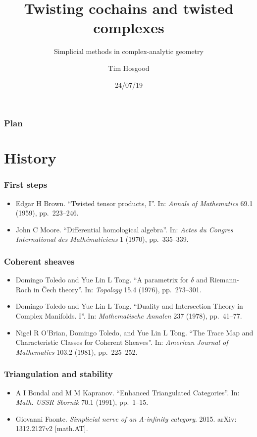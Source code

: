 \documentclass{beamer}
\title{Twisting cochains and twisted complexes}
\subtitle{Simplicial methods in complex-analytic geometry}
\author{Tim Hosgood}
\institute{Université d'Aix-Marseille\\\url{https://thosgood.github.io}}
\date{24/07/19}
\begin{document}
\begin{frame}
    \titlepage
\end{frame}

\begin{frame}\frametitle{Plan}
    \vspace{1em}
    \tableofcontents
\end{frame}


\section{History}

    \begin{frame}\frametitle{First steps}
        \begin{itemize}
            \item Edgar H Brown. ``Twisted tensor products, I''. In: \emph{Annals of Mathematics} 69.1 (1959), pp.~223--246.
            \item John C Moore. ``Differential homological algebra''. In: \emph{Actes du Congres International des Mathématiciens} 1 (1970), pp.~335--339.
        \end{itemize}
    \end{frame}

    \begin{frame}\frametitle{Coherent sheaves}
        \begin{itemize}
            \item Domingo Toledo and Yue Lin L Tong. ``A parametrix for $\delta$ and Riemann-Roch in Čech theory''. In: \emph{Topology} 15.4 (1976), pp.~273--301.
            \item Domingo Toledo and Yue Lin L Tong. ``Duality and Intersection Theory in Complex Manifolds. I''. In: \emph{Mathematische Annalen} 237 (1978), pp.~41--77.
            \item Nigel R O'Brian, Domingo Toledo, and Yue Lin L Tong. ``The Trace Map and Characteristic Classes for Coherent Sheaves''. In: \emph{American Journal of Mathematics} 103.2 (1981), pp.~225--252.
        \end{itemize}
    \end{frame}

    \begin{frame}\frametitle{Triangulation and stability}
        \begin{itemize}
            \item A I Bondal and M M Kapranov. ``Enhanced Triangulated Categories''. In: \emph{Math. USSR Sbornik} 70.1 (1991), pp.~1--15.
            \item Giovanni Faonte. \emph{Simplicial nerve of an A-infinity category}. 2015. arXiv: 1312.2127v2 [math.AT].
        \end{itemize}
    \end{frame}
\end{document}
